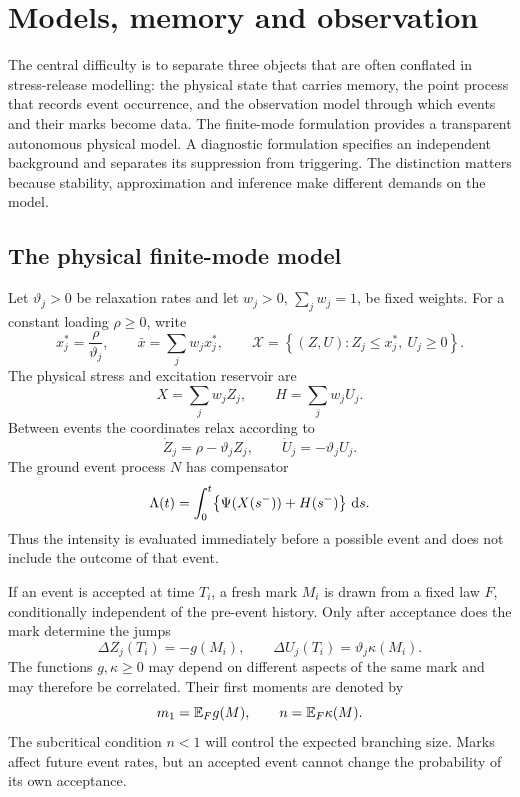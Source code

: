 \chapter{Models, memory and observation}\label{ch:models}

The central difficulty is to separate three objects that are often conflated in stress-release modelling: the physical state that carries memory, the point process that records event occurrence, and the observation model through which events and their marks become data. The finite-mode formulation provides a transparent autonomous physical model. A diagnostic formulation specifies an independent background and separates its suppression from triggering. The distinction matters because stability, approximation and inference make different demands on the model.

\section{The physical finite-mode model}\label{sec:model_physical}

Let \(\vartheta_j>0\) be relaxation rates and let \(w_j>0\), \(\sum_jw_j=1\), be fixed weights. For a constant loading \(\rho\geq0\), write
\[
x_j^*=\frac{\rho}{\vartheta_j},\qquad
\bar x=\sum_jw_jx_j^*,\qquad
\mathcal X=\left\{(Z,U):Z_j\leq x_j^*,\ U_j\geq0\right\}.
\]
The physical stress and excitation reservoir are
\begin{equation}\label{eq:physical-XH}
X=\sum_jw_jZ_j,\qquad H=\sum_jw_jU_j.
\end{equation}
Between events the coordinates relax according to
\begin{equation}\label{eq:finite-flow}
\dot Z_j=\rho-\vartheta_jZ_j,\qquad
\dot U_j=-\vartheta_jU_j.
\end{equation}
The ground event process \(N\) has compensator
\begin{equation}\label{eq:physical-compensator}
\Lambda(t)=\int_0^t\bigl\{\Psi(X(s^-))+H(s^-)\bigr\}\,\mathop{}\!\mathrm{d} s .
\end{equation}
Thus the intensity is evaluated immediately before a possible event and does not include the outcome of that event.

If an event is accepted at time \(T_i\), a fresh mark \(M_i\) is drawn from a fixed law \(F\), conditionally independent of the pre-event history. Only after acceptance does the mark determine the jumps
\begin{equation}\label{eq:finite-jumps}
\Delta Z_j(T_i)=-g(M_i),\qquad
\Delta U_j(T_i)=\vartheta_j\kappa(M_i).
\end{equation}
The functions \(g,\kappa\geq0\) may depend on different aspects of the same mark and may therefore be correlated. Their first moments are denoted by
\[
m_1=\mathbb{E} _F g(M),\qquad n=\mathbb{E} _F\kappa(M).
\]
The subcritical condition \(n<1\) will control the expected branching size. Marks affect future event rates, but an accepted event cannot change the probability of its own acceptance.


